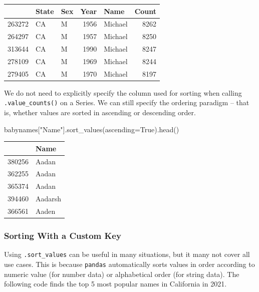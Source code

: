 \documentclass[
  letterpaper,
  DIV=11,
  numbers=noendperiod]{scrreprt}
\newenvironment{Shaded}{\begin{snugshade}}{\end{snugshade}}
\newcommand{\NormalTok}[1]{\textcolor[rgb]{0.00,0.23,0.31}{#1}}
\newcommand{\OperatorTok}[1]{\textcolor[rgb]{0.37,0.37,0.37}{#1}}
\newcommand{\StringTok}[1]{\textcolor[rgb]{0.13,0.47,0.30}{#1}}
\newcommand{\VariableTok}[1]{\textcolor[rgb]{0.07,0.07,0.07}{#1}}
\begin{document}
\begin{tabular}{lllrlr}
\toprule
{} & State & Sex &  Year &     Name &  Count \\
\midrule
263272 &    CA &   M &  1956 &  Michael &   8262 \\
264297 &    CA &   M &  1957 &  Michael &   8250 \\
313644 &    CA &   M &  1990 &  Michael &   8247 \\
278109 &    CA &   M &  1969 &  Michael &   8244 \\
279405 &    CA &   M &  1970 &  Michael &   8197 \\
\bottomrule
\end{tabular}

We do not need to explicitly specify the column used for sorting when
calling \texttt{.value\_counts()} on a Series. We can still specify the
ordering paradigm -- that is, whether values are sorted in ascending or
descending order.

\begin{Shaded}
\begin{Highlighting}[]
\NormalTok{babynames[}\StringTok{"Name"}\NormalTok{].sort\_values(ascending}\OperatorTok{=}\VariableTok{True}\NormalTok{).head()}
\end{Highlighting}
\end{Shaded}

\begin{tabular}{ll}
\toprule
{} &     Name \\
\midrule
380256 &    Aadan \\
362255 &    Aadan \\
365374 &    Aadan \\
394460 &  Aadarsh \\
366561 &    Aaden \\
\bottomrule
\end{tabular}

\hypertarget{sorting-with-a-custom-key}{%
\subsubsection{Sorting With a Custom
Key}\label{sorting-with-a-custom-key}}

Using \texttt{.sort\_values} can be useful in many situations, but it
many not cover all use cases. This is because \texttt{pandas}
automatically sorts values in order according to numeric value (for
number data) or alphabetical order (for string data). The following code
finds the top 5 most popular names in California in 2021.
\end{document}
